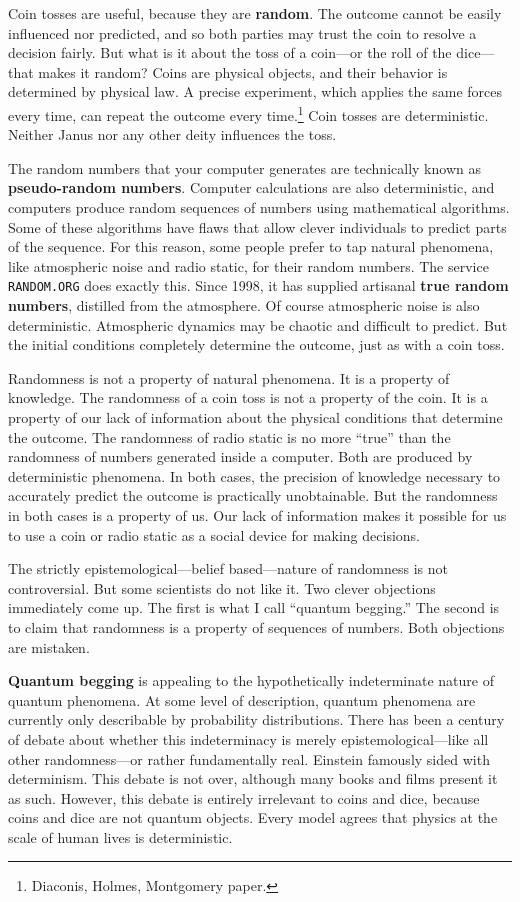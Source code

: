 \documentclass[10pt,reqno]{amsbook}
\newcommand{\bemph}[1]{{\textbf{\textcolor{bemphcol}{#1}}}}
\numberwithin{equation}{chapter}
\newcommand{\ttx}[1]{\texttt{#1}}
\begin{document}
Coin tosses are useful, because they are \bemph{random}. The outcome cannot be easily influenced nor predicted, and so both parties may trust the coin to resolve a decision fairly. But what is it about the toss of a coin---or the roll of the dice---that makes it random? Coins are physical objects, and their behavior is determined by physical law. A precise experiment, which applies the same forces every time, can repeat the outcome every time.\footnote{Diaconis, Holmes, Montgomery paper.} Coin tosses are deterministic. Neither Janus nor any other deity influences the toss.

The random numbers that your computer generates are technically known as \bemph{pseudo-random numbers}. Computer calculations are also deterministic, and computers produce random sequences of numbers using mathematical algorithms. Some of these algorithms have flaws that allow clever individuals to predict parts of the sequence. For this reason, some people prefer to tap natural phenomena, like atmospheric noise and radio static, for their random numbers. The service \ttx{RANDOM.ORG} does exactly this. Since 1998, it has supplied artisanal \bemph{true random numbers}, distilled from the atmosphere. Of course atmospheric noise is also deterministic. Atmospheric dynamics may be chaotic and difficult to predict. But the initial conditions completely determine the outcome, just as with a coin toss.

Randomness is not a property of natural phenomena. It is a property of knowledge. 
The randomness of a coin toss is not a property of the coin. It is a property of our lack of information about the physical conditions that determine the outcome. The randomness of radio static is no more ``true'' than the randomness of numbers generated inside a computer. Both are produced by deterministic phenomena. In both cases, the precision of knowledge necessary to accurately predict the outcome is practically unobtainable. But the randomness in both cases is a property of us. Our lack of information makes it possible for us to use a coin or radio static as a social device for making decisions.

The strictly epistemological---belief based---nature of randomness is not controversial. But some scientists do not like it. Two clever objections immediately come up. The first is what I call ``quantum begging.'' The second is to claim that randomness is a property of sequences of numbers. Both objections are mistaken.

\bemph{Quantum begging} is appealing to the hypothetically indeterminate nature of quantum phenomena. At some level of description, quantum phenomena are currently only describable by probability distributions. There has been a century of debate about whether this indeterminacy is merely epistemological---like all other randomness---or rather fundamentally real. Einstein famously sided with determinism. This debate is not over, although many books and films present it as such. However, this debate is entirely irrelevant to coins and dice, because coins and dice are not quantum objects. Every model agrees that physics at the scale of human lives is deterministic.
\end{document}
